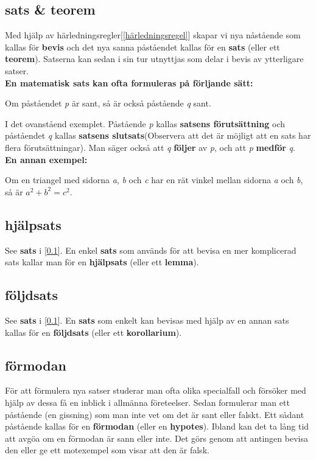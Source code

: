 \subsection{\textbf{sats \& teorem}}\label{sats}
    \textbf{\cite{sats}}Med hjälp av härledningsregler[\ref{härledningsregel}] skapar vi nya nåstående som kallas för \textbf{bevis} och det nya sanna påståendet kallas för en \textbf{sats} (eller ett \textbf{teorem}). Satserna kan sedan i sin tur utnyttjas som delar i bevis av ytterligare satser.
    \\\textbf{En matematisk sats kan ofta formuleras på förljande sätt:}
    \vspace{3 mm}
    \begin{adjustwidth}{10 mm}{10 mm}
        Om påståendet \textsl{p} är sant, så är också påstående \textsl{q} sant.
    \end{adjustwidth}
    \vspace{3 mm}
    I det ovanståend exemplet. Påstående \textsl{p} kallas \textbf{satsens förutsättning} och påståendet \textsl{q} kallas \textbf{satsens slutsats}(Observera att det är möjligt att en sats har flera förutsättningar). Man säger också att \textsl{q} \textbf{följer} av \textsl{p}, och att \textsl{p} \textbf{medför} \textsl{q}.
    \\\textbf{En annan exempel:}
    \vspace{3 mm}
    \begin{adjustwidth}{10 mm}{10 mm}
        Om en triangel med sidorna \textsl{a}, \textsl{b} och \textsl{c} har en rät vinkel mellan sidorna \textsl{a} och \textsl{b}, så är $a^2+b^2=c^2$.
    \end{adjustwidth}
    \vspace{3 mm}
\subsection{\textbf{hjälpsats}}\label{hjälpsats}
    See \textbf{sats} i [\ref{sats}]. En enkel \textbf{sats} som används för att bevisa en mer komplicerad sats kallar man för en \textbf{hjälpsats} (eller ett \textbf{lemma}).
\subsection{\textbf{följdsats}}\label{följdsats}
    See \textbf{sats} i [\ref{sats}]. En \textbf{sats} som enkelt kan bevisas med hjälp av en annan sats kallas för en \textbf{följdsats} (eller ett \textbf{korollarium}).
\subsection{{\textbf{förmodan}}}\label{förmodan}
    \textbf{\cite{förmodan}} För att förmulera nya satser studerar man ofta olika specialfall och försöker med hjälp av dessa få en inblick i allmänna företeelser. Sedan formulerar man ett påstående (en gissning) som man inte vet om det är sant eller falskt. Ett sådant påstående kallas för en \textbf{förmodan} (eller en \textbf{hypotes}). Ibland kan det ta lång tid att avgöa om en förmodan är sann eller inte. Det görs genom att antingen bevisa den eller ge ett motexempel som visar att den är falsk.

